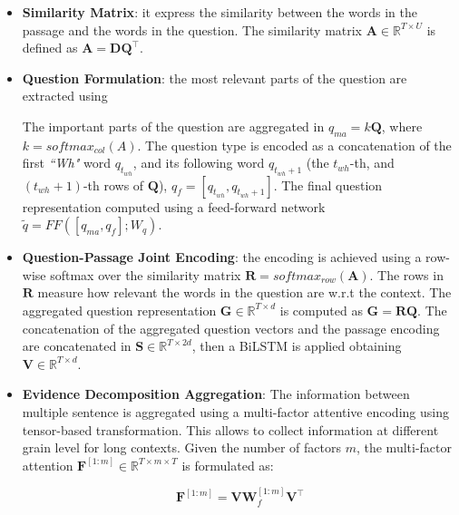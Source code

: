 \begin{itemize}[-]
    \item \textbf{Similarity Matrix}: it express the similarity between the words in the passage and the words in the question. The similarity matrix $\mathbf{A} \in \mathbb{R}^{T \times U}$ is defined as $\mathbf{A} = \mathbf{D}\mathbf{Q}^{\intercal}$.
    \item \textbf{Question Formulation}: the most relevant parts of the question are extracted using   The important parts of the question are aggregated in $q_{ma} = k\mathbf{Q}$, where $k = softmax_{col}(A)$. The question type is encoded as a concatenation of the first \textit{``Wh"} word $q_{t_{wh}}$, and its following word $q_{t_{wh}+1}$ (the $t_{wh}$-th, and $(t_{wh}+1)$-th rows of $\mathbf{Q}$), $q_f = [q_{t_{wh}}, q_{t_{wh}+1}]$. The final question representation computed using a feed-forward network $\tilde{q} = {FF}([q_{ma}, q_f]; W_q)$. 
    
    \item \textbf{Question-Passage Joint Encoding}: the encoding is achieved using a row-wise softmax over the similarity matrix $\textbf{R} = softmax_{row}(\mathbf{A})$. The rows in $\mathbf{R}$ measure how relevant the words in the question are w.r.t the context. The aggregated question representation $\mathbf{G} \in \mathbb{R}^{T \times d}$ is computed as $\mathbf{G} = \mathbf{R}\mathbf{Q}$. The concatenation of the aggregated question vectors and the passage encoding are concatenated in $\mathbf{S} \in \mathbb{R} ^{T \times 2d}$, then a BiLSTM is applied obtaining  $\mathbf{V} \in \mathbb{R} ^{T \times d}$.
    
    
    \item \textbf{Evidence Decomposition Aggregation}: The information between multiple sentence is aggregated using a multi-factor attentive encoding using tensor-based transformation. This allows to collect information at different grain level for long contexts.
    Given the number of factors $m$, the multi-factor attention $\mathbf{F}^{[1:m]} \in \mathbb{R} ^{T \times m \times T}$ is formulated as:
    
    \begin{equation}
    \mathbf{F}^{[1:m]} = \mathbf{V}\mathbf{W}_{f}^{[1:m]}\mathbf{V}^{\intercal}    
    \end{equation}
    

\end{itemize}
